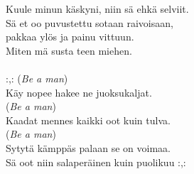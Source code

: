 Kuule minun käskyni, niin sä ehkä selviit.\\
Sä et oo puvustettu sotaan raivoisaan,\\
pakkaa ylös ja painu vittuun.\\
Miten mä susta teen miehen.\\
\hspace{10mm} \\
:,: (\textit{Be a man})\\ Käy nopee hakee ne juoksukaljat.\\
(\textit{Be a man})\\ Kaadat mennes kaikki oot kuin tulva.\\
(\textit{Be a man})\\ Sytytä kämppäs palaan se on voimaa.\\
Sä oot niin salaperäinen kuin puolikuu :,:\\